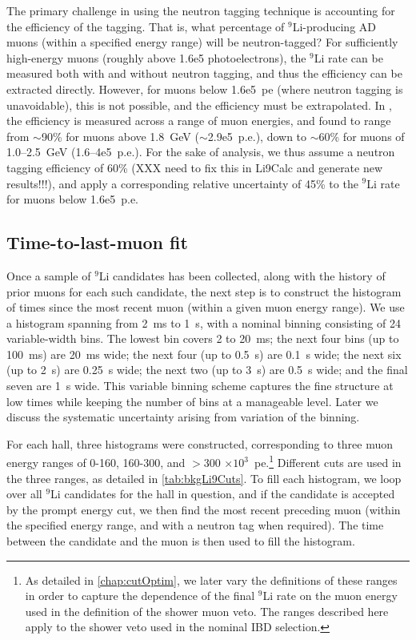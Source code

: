\documentclass[../thesis.tex]{subfiles}
\begin{document}
The primary challenge in using the neutron tagging technique is accounting for the efficiency of the tagging. That is, what percentage of $^9$Li-producing AD muons (within a specified energy range) will be neutron-tagged? For sufficiently high-energy muons (roughly above 1.6e5 photoelectrons), the $^9$Li rate can be measured both with and without neutron tagging, and thus the efficiency can be extracted directly. However, for muons below 1.6e5~pe (where neutron tagging is unavoidable), this is not possible, and the efficiency must be extrapolated. In \cite{WeiLi9}, the efficiency is measured across a range of muon energies, and found to range from $\sim$90\% for muons above 1.8~GeV ($\sim$2.9e5~p.e.), down to $\sim$60\% for muons of 1.0--2.5~GeV (1.6--4e5~p.e.). For the sake of analysis, we thus assume a neutron tagging efficiency of 60\% (XXX need to fix this in Li9Calc and generate new results!!!), and apply a corresponding relative uncertainty of 45\% to the $^9$Li rate for muons below 1.6e5~p.e.

\subsection{Time-to-last-muon fit}
\label{sec:bkgLi9HistoFit}

Once a sample of $^9$Li candidates has been collected, along with the history of prior muons for each such candidate, the next step is to construct the histogram of times since the most recent muon (within a given muon energy range). We use a histogram spanning from 2~ms to 1~s, with a nominal binning consisting of 24 variable-width bins. The lowest bin covers 2 to 20~ms; the next four bins (up to 100~ms) are 20~ms wide; the next four (up to 0.5~s) are 0.1~s wide; the next six (up to 2~s) are 0.25~s wide; the next two (up to 3~s) are 0.5~s wide; and the final seven are 1~s wide. This variable binning scheme captures the fine structure at low times while keeping the number of bins at a manageable level. Later we discuss the systematic uncertainty arising from variation of the binning.

For each hall, three histograms were constructed, corresponding to three muon energy ranges of 0-160, 160-300, and $>$300 $\times10^3$~pe.\footnote{As detailed in \autoref{chap:cutOptim}, we later vary the definitions of these ranges in order to capture the dependence of the final $^9$Li rate on the muon energy used in the definition of the shower muon veto. The ranges described here apply to the shower veto used in the nominal IBD selection.} Different cuts are used in the three ranges, as detailed in \autoref{tab:bkgLi9Cuts}. To fill each histogram, we loop over all $^9$Li candidates for the hall in question, and if the candidate is accepted by the prompt energy cut, we then find the most recent preceding muon (within the specified energy range, and with a neutron tag when required). The time between the candidate and the muon is then used to fill the histogram.
\end{document}
